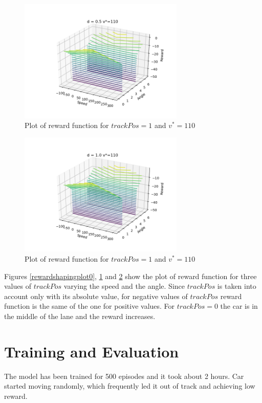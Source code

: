 \documentclass[Lau,oneside,noexaminfo]{sapthesis} %
\begin{document}
\begin{figure}[H]
  \centering
  \includegraphics[width=0.7\textwidth]{reward_plot05}
  \caption{Plot of reward function for $trackPos = 1$ and $v^*=110$}
  \label{rewardshapingplot05}
\end{figure}
\begin{figure}[H]
  \centering
  \includegraphics[width=0.7\textwidth]{reward_plot1}
  \caption{Plot of reward function for $trackPos = 1$ and $v^*=110$}
  \label{rewardshapingplot1}
\end{figure}
Figures \ref{rewardshapingplot0}, \ref{rewardshapingplot05} and \ref{rewardshapingplot1} show the plot of reward function for three values of $trackPos$ varying the speed and the angle. Since $trackPos$ is taken into account only with its absolute value, for negative values of $trackPos$ reward function is the same of the one for positive values. For $trackPos = 0$ the car is in the middle of the lane and the reward increases.



\chapter{Training and Evaluation}
The model has been trained for 500 episodes and it took about 2 hours. Car started moving randomly, which frequently led it out of track and achieving low reward. 
\end{document}
